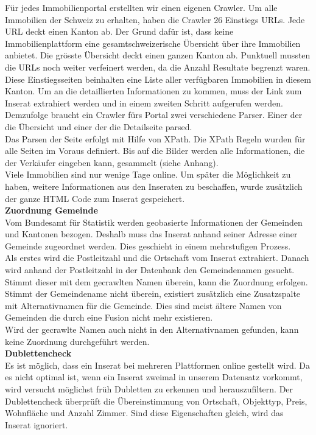 %
Für jedes Immobilienportal erstellten wir einen eigenen Crawler. Um alle Immobilien der Schweiz zu erhalten, haben die Crawler 26 Einstiegs URLs. Jede URL deckt einen Kanton ab. Der Grund dafür ist, dass keine Immobilienplattform eine gesamtschweizerische Übersicht über ihre Immobilien anbietet. Die grösste Übersicht deckt einen ganzen Kanton ab. Punktuell mussten die URLs noch weiter verfeinert werden, da die Anzahl Resultate begrenzt waren.\\
Diese Einstiegsseiten beinhalten eine Liste aller verfügbaren Immobilien in diesem Kanton. Um an die detaillierten Informationen zu kommen, muss der Link zum Inserat extrahiert werden und in einem zweiten Schritt aufgerufen werden.
Demzufolge braucht ein Crawler fürs Portal zwei verschiedene Parser. Einer der die Übersicht und einer der die Detailseite parsed.\\[2ex]
%
Das Parsen der Seite erfolgt mit Hilfe von XPath. Die XPath Regeln wurden für alle Seiten im Voraus definiert. Bis auf die Bilder werden alle Informationen, die der Verkäufer eingeben kann, gesammelt (siehe Anhang).\\
Viele Immobilien sind nur wenige Tage online. Um später die Möglichkeit zu haben, weitere Informationen aus den Inseraten zu beschaffen, wurde zusätzlich der ganze HTML Code zum Inserat gespeichert.\\[2ex]
%
\textbf{Zuordnung Gemeinde}\\
Vom Bundesamt für Statistik werden geobasierte Informationen der Gemeinden und Kantonen bezogen. Deshalb muss das Inserat anhand seiner Adresse einer Gemeinde zugeordnet werden. Dies geschieht in einem mehrstufigen Prozess.\\
Als erstes wird die Postleitzahl und die Ortschaft vom Inserat extrahiert. Danach wird anhand der Postleitzahl in der Datenbank den Gemeindenamen gesucht. Stimmt dieser mit dem gecrawlten Namen überein, kann die Zuordnung erfolgen.\\
Stimmt der Gemeindename nicht überein, existiert zusätzlich eine Zusatzspalte mit Alternativnamen für die Gemeinde.  Dies sind meist ältere Namen von Gemeinden die durch eine Fusion nicht mehr existieren.\\
Wird der gecrawlte Namen auch nicht in den Alternativnamen gefunden, kann keine Zuordnung durchgeführt werden.\\[2ex]
%
\textbf{Dublettencheck}\\
Es ist möglich, dass ein Inserat bei mehreren Plattformen online gestellt wird. Da es nicht optimal ist, wenn ein Inserat zweimal in unserem Datensatz vorkommt, wird versucht möglichst früh Dubletten zu erkennen und herauszufiltern. Der Dublettencheck überprüft die Übereinstimmung von Ortschaft, Objekttyp, Preis, Wohnfläche und Anzahl Zimmer. Sind diese Eigenschaften gleich, wird das Inserat ignoriert.\\[2ex]
